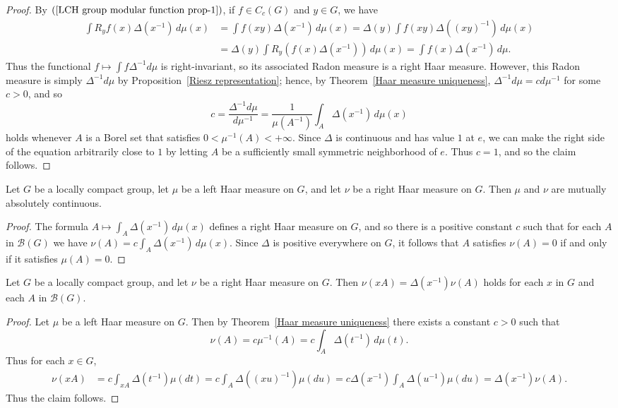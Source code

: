 \begin{proof}
By $(\ref{LCH group modular function prop-1})$, if $f\in C_c(G)$ and $y\in G$, we have
\begin{align*}
\int R_yf(x)\Delta(x^{-1})\,d\mu(x)&=\int f(xy)\Delta(x^{-1})\,d\mu(x)=\Delta(y)\int f(xy)\Delta((xy)^{-1})\,d\mu(x)\\
&=\Delta(y)\int R_y(f(x)\Delta(x^{-1}))\,d\mu(x)=\int f(x)\Delta(x^{-1})\,d\mu.
\end{align*}
Thus the functional $f\mapsto\int f\Delta^{-1}d\mu$ is right-invariant, so its associated Radon measure is a right Haar measure. However, this Radon measure is simply $\Delta^{-1}d\mu$ by Proposition~\ref{Riesz representation}; hence, by Theorem~\ref{Haar measure uniqueness}, $\Delta^{-1}d\mu=cd\mu^{-1}$ for some $c>0$, and so
\[c=\frac{\Delta^{-1}d\mu}{d\mu^{-1}}=\frac{1}{\mu(A^{-1})}\int_A\Delta(x^{-1})\,d\mu(x)\]
holds whenever $A$ is a Borel set that satisfies $0<\mu^{-1}(A)<+\infty$. Since $\Delta$ is continuous and has value $1$ at $e$, we can make the right side of the equation arbitrarily close to $1$ by letting $A$ be a sufficiently small symmetric neighborhood of $e$. Thus $c=1$, and
so the claim follows.
\end{proof}
\begin{corollary}\label{Haar measure left and right absolutely continuous}
Let $G$ be a locally compact group, let $\mu$ be a left Haar measure on $G$, and let $\nu$ be a right Haar measure on $G$. Then $\mu$ and $\nu$ are mutually absolutely continuous.
\end{corollary}
\begin{proof}
The formula $A\mapsto\int_A\Delta(x^{-1})\,d\mu(x)$ defines a right Haar measure on $G$, and so there is a positive constant $c$ such that for each $A$ in $\mathcal{B}(G)$ we have $\nu(A)=c\int_A\Delta(x^{-1})\,d\mu(x)$. Since $\Delta$ is positive everywhere on $G$, it follows that $A$ satisfies $\nu(A)=0$ if and only if it satisfies $\mu(A)=0$.
\end{proof}
\begin{corollary}
Let $G$ be a locally compact group, and let $\nu$ be a right Haar measure on $G$. Then $\nu(xA)=\Delta(x^{-1})\nu(A)$ holds for each $x$ in $G$ and each $A$ in $\mathcal{B}(G)$.
\end{corollary}
\begin{proof}
Let $\mu$ be a left Haar measure on $G$. Then by Theorem~\ref{Haar measure uniqueness} there exists a constant $c>0$ such that
\[\nu(A)=c\mu^{-1}(A)=c\int_A\Delta(t^{-1})\,d\mu(t).\]
Thus for each $x\in G$,
\begin{align*}
\nu(xA)&=c\int_{xA}\Delta(t^{-1})\mu(dt)=c\int_A\Delta((xu)^{-1})\mu(du)=c\Delta(x^{-1})\int_A\Delta(u^{-1})\mu(du)=\Delta(x^{-1})\nu(A).
\end{align*}
Thus the claim follows.
\end{proof}
